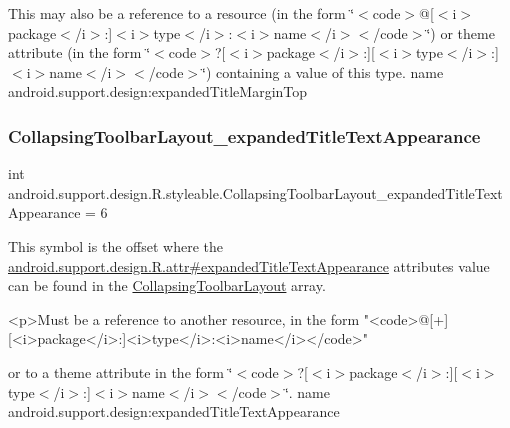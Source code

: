 This may also be a reference to a resource (in the form \char`\"{}$<$code$>$@\mbox{[}$<$i$>$package$<$/i$>$\+:\mbox{]}$<$i$>$type$<$/i$>$\+:$<$i$>$name$<$/i$>$$<$/code$>$\char`\"{}) or theme attribute (in the form \char`\"{}$<$code$>$?\mbox{[}$<$i$>$package$<$/i$>$\+:\mbox{]}\mbox{[}$<$i$>$type$<$/i$>$\+:\mbox{]}$<$i$>$name$<$/i$>$$<$/code$>$\char`\"{}) containing a value of this type.  name android.\+support.\+design\+:expanded\+Title\+Margin\+Top \mbox{\label{classandroid_1_1support_1_1design_1_1R_1_1styleable_ac93bbda7f962bc3fa75ce23c2ec87ab8}} 
\subsubsection{\texorpdfstring{Collapsing\+Toolbar\+Layout\+\_\+expanded\+Title\+Text\+Appearance}{CollapsingToolbarLayout\_expandedTitleTextAppearance}}
{\footnotesize\ttfamily int android.\+support.\+design.\+R.\+styleable.\+Collapsing\+Toolbar\+Layout\+\_\+expanded\+Title\+Text\+Appearance = 6\hspace{0.3cm}{\ttfamily [static]}}

This symbol is the offset where the \hyperlink{classandroid_1_1support_1_1design_1_1R_1_1attr_a76fae0174c646f6356295d5fa987cf07}{android.\+support.\+design.\+R.\+attr\#expanded\+Title\+Text\+Appearance} attribute\textquotesingle{}s value can be found in the \hyperlink{classandroid_1_1support_1_1design_1_1R_1_1styleable_a4a019838b1c3daad84b4ffff397db335}{Collapsing\+Toolbar\+Layout} array.

\begin{DoxyVerb}      <p>Must be a reference to another resource, in the form "<code>@[+][<i>package</i>:]<i>type</i>:<i>name</i></code>"
\end{DoxyVerb}
 or to a theme attribute in the form \char`\"{}$<$code$>$?\mbox{[}$<$i$>$package$<$/i$>$\+:\mbox{]}\mbox{[}$<$i$>$type$<$/i$>$\+:\mbox{]}$<$i$>$name$<$/i$>$$<$/code$>$\char`\"{}.  name android.\+support.\+design\+:expanded\+Title\+Text\+Appearance \mbox{\label{classandroid_1_1support_1_1design_1_1R_1_1styleable_a675be9c93480a98f854416553d174e4b}} 
